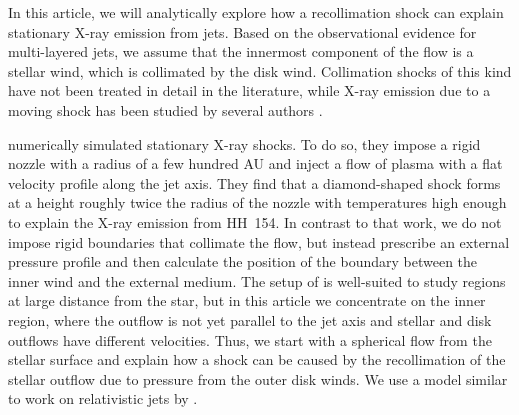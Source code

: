 In this article, we will analytically explore how a recollimation shock can explain stationary X-ray emission from jets. Based on the observational evidence for multi-layered jets, we assume that the innermost component of the flow is a stellar wind, which is collimated by the disk wind. Collimation shocks of this kind have not been treated in detail in the literature, while X-ray emission due to a moving shock has been studied by several authors \citep[see, e.g.\ the analytical work and numerical simulations by][]{2002ApJ...576L.149R,2007A&A...462..645B,2010A&A...517A..68B}.

\citet{2011ApJ...737...54B} numerically simulated stationary X-ray shocks. To do so, they impose a rigid nozzle with a radius of a few hundred AU and inject a flow of plasma with a flat velocity profile along the jet axis. They find that a diamond-shaped shock forms at a height roughly twice the radius of the nozzle with temperatures high enough to explain the X-ray emission from HH~154. In contrast to that work, we do not impose rigid boundaries that collimate the flow, but instead prescribe an external pressure profile and then calculate the position of the boundary between the inner wind and the external medium. The setup of \citet{2011ApJ...737...54B} is well-suited to study regions at large distance from the star, but in this article we concentrate on the inner region, where the outflow is not yet parallel to the jet axis and stellar and disk outflows have different velocities. Thus, we start with a spherical flow from the stellar surface and explain how a shock can be caused by the recollimation of the stellar outflow due to pressure from the outer disk winds. We use a model similar to work on relativistic jets by \citet{2012MNRAS.422.2282K}.